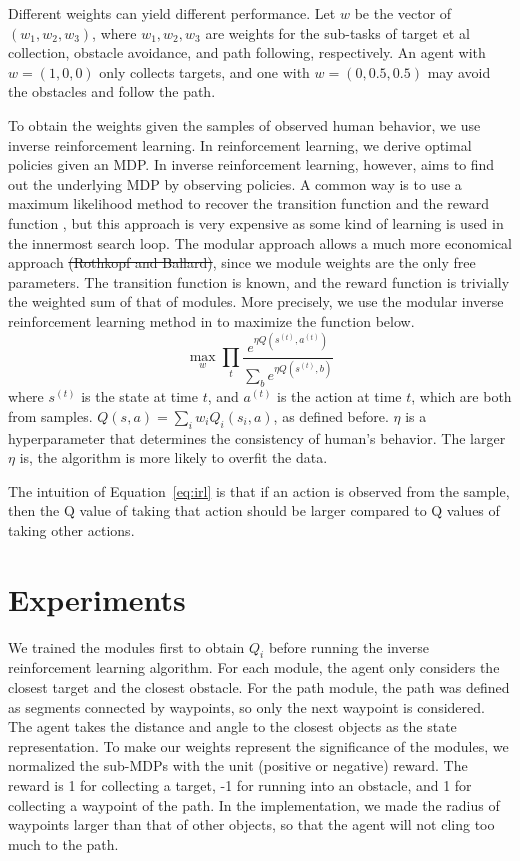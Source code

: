 \documentclass[11pt]{article} %
\providecommand{\DIFadd}[1]{{\protect\color{blue}\uwave{#1}}} %
\providecommand{\DIFdel}[1]{{\protect\color{red}\sout{#1}}}                      %
\providecommand{\DIFaddbegin}{} %
\providecommand{\DIFaddend}{} %
\providecommand{\DIFdelbegin}{} %
\providecommand{\DIFdelend}{} %
\begin{document}
Different weights can yield different performance. Let $w$ be the vector of
$(w_1, w_2, w_3)$, where $w_1, w_2, w_3$ are weights for the sub-tasks of target et al 
collection, obstacle avoidance, and path following, respectively. An agent with
$w = (1, 0, 0)$ only collects targets, and one with $w = (0, 0.5, 0.5)$ may
avoid the obstacles and follow the path.

To obtain the weights given the samples of observed human behavior, we use inverse
reinforcement learning. In reinforcement learning, we derive 
optimal policies given an MDP. In inverse reinforcement learning, however, aims to
find out the underlying MDP by observing policies. A common
way is to use a maximum likelihood method to recover the transition function and
the reward function \cite{ng2000algorithms}, but this approach is very expensive
as some kind of learning is used in the innermost search loop. The modular
approach allows a much more economical approach \DIFdelbegin \DIFdel{(Rothkopf and Ballard)}\DIFdelend \DIFaddbegin \DIFadd{\mbox{%
\cite{rothkopf2013modular}
}%
}\DIFaddend ,
since we module weights are the only free parameters. The transition function is
known, and the reward function is trivially the weighted sum of that of modules.
More precisely, we use the modular inverse reinforcement learning method in
\cite{rothkopf2013modular} to maximize the function below.
\begin{equation}
\label{eq:irl}
\max_w \prod_t \frac{e^{\eta Q(s^{(t)}, a^{(t)})}}{\sum_b e^{\eta Q(s^{(t)}, b)}}
\end{equation}
where $s^{(t)}$ is the state at time $t$, and $a^{(t)}$ is the action at time
$t$, which are both from samples. $Q(s, a) = \sum_i w_i Q_i(s_i, a)$, as defined
before. $\eta$ is a hyperparameter that determines the consistency of human's
behavior. The larger $\eta$ is, the algorithm is more likely to overfit the data.

The intuition of Equation~\ref{eq:irl} is that if an action is observed from the
sample, then the Q value of taking that action should be larger compared to Q
values of taking other actions.

\section{Experiments}
\label{sec:exp}

We trained the modules first to obtain $Q_i$ before running the inverse
reinforcement learning algorithm. For each module, the agent only considers the
closest target and the closest obstacle. For the path module, the path was
defined as segments connected by waypoints, so only the next waypoint is
considered. The agent takes the distance and angle to the closest objects as the
state representation. To make our weights represent the significance of the
modules, we normalized the sub-MDPs with the unit (positive or negative) reward.
The reward is 1 for collecting a target, -1 for running into an obstacle, and 1
for collecting a waypoint of the path. In the implementation, we made the radius
of waypoints larger than that of other objects, so that the agent will not cling
too much to the path.
\end{document}
